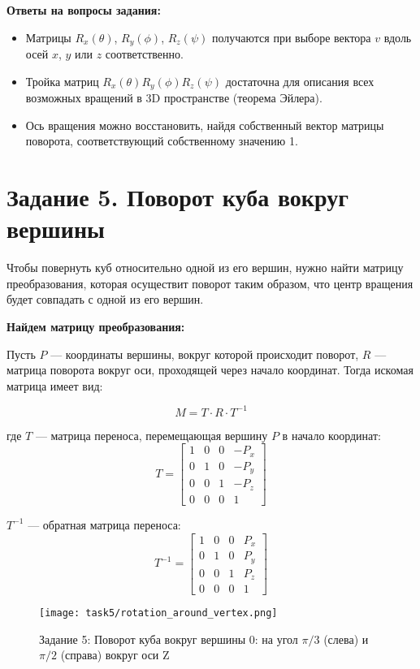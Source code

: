 \textbf{Ответы на вопросы задания:}
\begin{itemize}
    \item Матрицы $R_x(\theta)$, $R_y(\phi)$, $R_z(\psi)$ получаются при выборе вектора $v$ вдоль осей $x$, $y$ или $z$ соответственно.
    \item Тройка матриц $R_x(\theta)R_y(\phi)R_z(\psi)$ достаточна для описания всех возможных вращений в 3D пространстве (теорема Эйлера).
    \item Ось вращения можно восстановить, найдя собственный вектор матрицы поворота, соответствующий собственному значению 1.
\end{itemize}

\section{Задание 5. Поворот куба вокруг вершины}

Чтобы повернуть куб относительно одной из его вершин, нужно найти матрицу преобразования, которая осуществит поворот таким образом, что центр вращения будет совпадать с одной из его вершин.

\textbf{Найдем матрицу преобразования:}

Пусть $P$ --- координаты вершины, вокруг которой происходит поворот, $R$ --- матрица поворота вокруг оси, проходящей через начало координат. Тогда искомая матрица имеет вид:

\[
M = T \cdot R \cdot T^{-1}
\]

где $T$ --- матрица переноса, перемещающая вершину $P$ в начало координат:
\[
T = \begin{bmatrix}
1 & 0 & 0 & -P_x \\
0 & 1 & 0 & -P_y \\
0 & 0 & 1 & -P_z \\
0 & 0 & 0 & 1
\end{bmatrix}
\]

$T^{-1}$ --- обратная матрица переноса:
\[
T^{-1} = \begin{bmatrix}
1 & 0 & 0 & P_x \\
0 & 1 & 0 & P_y \\
0 & 0 & 1 & P_z \\
0 & 0 & 0 & 1
\end{bmatrix}
\]

\begin{figure}[h!]
    \centering
    \texttt{[image: task5/rotation\_around\_vertex.png]}
    \caption{Задание 5: Поворот куба вокруг вершины 0: на угол $\pi/3$ (слева) и $\pi/2$ (справа) вокруг оси Z}
\end{figure}


